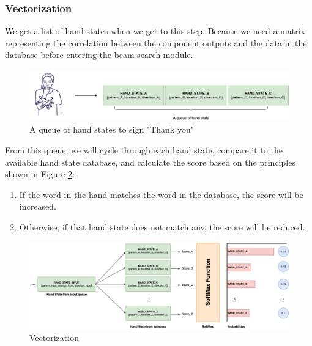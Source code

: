 \subsubsection{ Vectorization }

We get a list of hand states when we get to this step. Because we need a matrix representing the correlation between the component outputs and the data in the database before entering the beam search module.

\begin{figure}[H]
  \centering
  \includegraphics[width=\textwidth]{img/Chap4/HandStateQueue.png}
  \caption{A queue of hand states to sign "Thank you"}
  \label{fig:Chap4-HandStateQueue}
\end{figure}

From this queue, we will cycle through each hand state, compare it to the available hand state database, and calculate the score based on the principles shown in Figure \ref{fig:Chap4-Vectorization}:

\begin{enumerate}
  \item If the word in the hand matches the word in the database, the score will be increased.
  \item Otherwise, if that hand state does not match any, the score will be reduced.
\end{enumerate}

\begin{figure}[H]
  \centering
  \includegraphics[width=\textwidth]{img/Chap4/Vectorization.png}
  \caption{ Vectorization }
  \label{fig:Chap4-Vectorization}
\end{figure}

